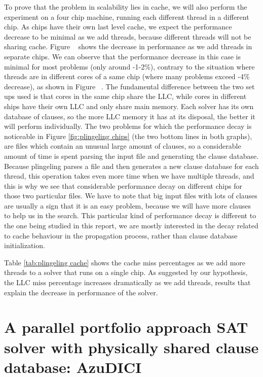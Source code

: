 \documentclass[12pt]{diicc}
\begin{document}
To prove that the problem in scalability lies in cache, we will also perform the experiment on a four chip machine, running each different thread in a different chip. As chips have their own last level cache, we expect the performance decrease to be minimal as we add threads, because different threads will not be sharing cache. Figure ~ shows the decrease in performance as we add threads in separate chips. We can observe that the performance decrease in this case is minimal for most problems (only around -1-2\%), contrary to the situation where threads are in different cores of a same chip (where many problems exceed -4\% decrease), as shown in Figure ~. The fundamental difference between the two set ups used is that cores in the same chip share the LLC, while cores in different ships have their own LLC and only share main memory. Each solver has its own database of clauses, so the more LLC memory it has at its disposal, the better it will perform individually. The two problems for which the performance decay is noticeable in Figure \ref{fig:plingeling chips} (the two bottom lines in both graphs), are files which contain an unusual large amount of clauses, so a considerable amount of time is spent parsing the input file and generating the clause database. Because plingeling parses a file and then generates a new clause database for each thread, this operation takes even more time when we have multiple threads, and this is why we see that considerable performance decay on different chips for those two particular files. We have to note that big input files with lots of clauses are usually a sign that it is an easy problem, because we will have more clauses to help us in the search. This particular kind of performance decay is different to the one being studied in this report, we are mostly interested in the decay related to cache behaviour in the propagation process, rather than clause database initialization.


Table \ref{tab:plingeling cache} shows the cache miss percentages as we add more threads to a solver that runs on a single chip. As suggested by our hypothesis, the LLC miss percentage increases dramatically as we add threads, results that explain the decrease in performance of the solver.

\section{A parallel portfolio approach SAT solver with physically shared clause database: AzuDICI}
\end{document}
